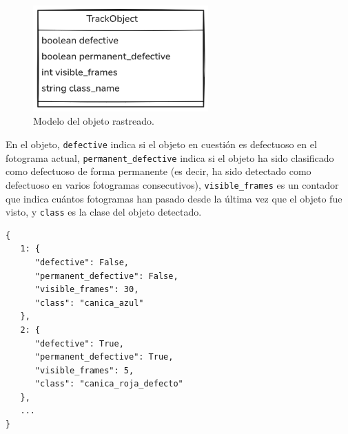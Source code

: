 \documentclass[11pt,spanish,listoffigures,listoftables]{tfgetsinf}
\begin{document}
\begin{figure}[H]
   \centering
   \includegraphics[width=0.6\textwidth]{images/diseno_e_implementacion/track_object.png}
   \caption[Modelo del objeto rastreado]{Modelo del objeto rastreado.}
   \label{fig:track_object}
\end{figure}

En el objeto, \texttt{defective} indica si el objeto en cuestión es defectuoso en el fotograma actual, \texttt{permanent\_defective} indica si el objeto ha sido clasificado como defectuoso de forma permanente (es decir, ha sido detectado como defectuoso en varios fotogramas consecutivos), \texttt{visible\_frames} es un contador que indica cuántos fotogramas han pasado desde la última vez que el objeto fue visto, y \texttt{class} es la clase del objeto detectado.



\begin{lstlisting}[style=seguimiento, caption={Ejemplo de memoria de seguimiento}]
{
   1: {
      "defective": False,
      "permanent_defective": False,
      "visible_frames": 30,
      "class": "canica_azul"
   },
   2: {
      "defective": True,
      "permanent_defective": True,
      "visible_frames": 5,
      "class": "canica_roja_defecto"
   },
   ...
}
\end{lstlisting}
\end{document}
